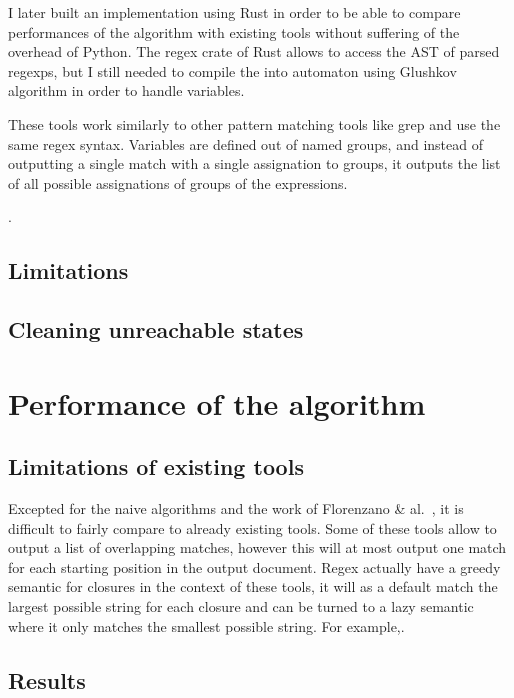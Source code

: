 \documentclass[12px]{article}
\begin{document}
      I later built an implementation using Rust in order to be able to compare
      performances of the algorithm with existing tools without suffering of
      the overhead of Python. The regex crate of Rust allows to access the
      AST of parsed regexps, but I still needed to compile the into automaton
      using Glushkov algorithm in order to handle variables.

      These tools work similarly to other pattern matching tools like grep and
      use the same regex syntax. Variables are defined out of named groups, and
      instead of outputting a single match with a single assignation to groups,
      it outputs the list of all possible assignations of groups of the
      expressions.

      .

    \subsection{Limitations}


    \subsection{Cleaning unreachable states}


  \section{Performance of the algorithm}

    \subsection{Limitations of existing tools}

      Excepted for the naive algorithms and the work of Florenzano \&
      al.~, it is difficult to fairly compare to already
      existing tools. Some of these tools allow to output a list of overlapping
      matches, however this will at most output one match for each starting
      position in the output document. Regex actually have a greedy semantic
      for closures in the context of these tools, it will as a default match
      the largest possible string for each closure and can be turned to a lazy
      semantic where it only matches the smallest possible string. For
      example,.

    \subsection{Results}


  \pagebreak
  
  
\end{document}
